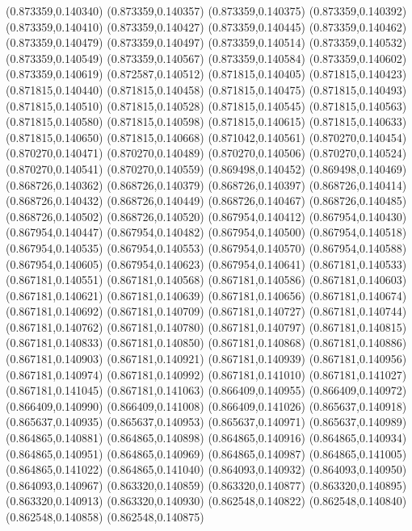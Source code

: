 (0.873359,0.140340)
(0.873359,0.140357)
(0.873359,0.140375)
(0.873359,0.140392)
(0.873359,0.140410)
(0.873359,0.140427)
(0.873359,0.140445)
(0.873359,0.140462)
(0.873359,0.140479)
(0.873359,0.140497)
(0.873359,0.140514)
(0.873359,0.140532)
(0.873359,0.140549)
(0.873359,0.140567)
(0.873359,0.140584)
(0.873359,0.140602)
(0.873359,0.140619)
(0.872587,0.140512)
(0.871815,0.140405)
(0.871815,0.140423)
(0.871815,0.140440)
(0.871815,0.140458)
(0.871815,0.140475)
(0.871815,0.140493)
(0.871815,0.140510)
(0.871815,0.140528)
(0.871815,0.140545)
(0.871815,0.140563)
(0.871815,0.140580)
(0.871815,0.140598)
(0.871815,0.140615)
(0.871815,0.140633)
(0.871815,0.140650)
(0.871815,0.140668)
(0.871042,0.140561)
(0.870270,0.140454)
(0.870270,0.140471)
(0.870270,0.140489)
(0.870270,0.140506)
(0.870270,0.140524)
(0.870270,0.140541)
(0.870270,0.140559)
(0.869498,0.140452)
(0.869498,0.140469)
(0.868726,0.140362)
(0.868726,0.140379)
(0.868726,0.140397)
(0.868726,0.140414)
(0.868726,0.140432)
(0.868726,0.140449)
(0.868726,0.140467)
(0.868726,0.140485)
(0.868726,0.140502)
(0.868726,0.140520)
(0.867954,0.140412)
(0.867954,0.140430)
(0.867954,0.140447)
(0.867954,0.140482)
(0.867954,0.140500)
(0.867954,0.140518)
(0.867954,0.140535)
(0.867954,0.140553)
(0.867954,0.140570)
(0.867954,0.140588)
(0.867954,0.140605)
(0.867954,0.140623)
(0.867954,0.140641)
(0.867181,0.140533)
(0.867181,0.140551)
(0.867181,0.140568)
(0.867181,0.140586)
(0.867181,0.140603)
(0.867181,0.140621)
(0.867181,0.140639)
(0.867181,0.140656)
(0.867181,0.140674)
(0.867181,0.140692)
(0.867181,0.140709)
(0.867181,0.140727)
(0.867181,0.140744)
(0.867181,0.140762)
(0.867181,0.140780)
(0.867181,0.140797)
(0.867181,0.140815)
(0.867181,0.140833)
(0.867181,0.140850)
(0.867181,0.140868)
(0.867181,0.140886)
(0.867181,0.140903)
(0.867181,0.140921)
(0.867181,0.140939)
(0.867181,0.140956)
(0.867181,0.140974)
(0.867181,0.140992)
(0.867181,0.141010)
(0.867181,0.141027)
(0.867181,0.141045)
(0.867181,0.141063)
(0.866409,0.140955)
(0.866409,0.140972)
(0.866409,0.140990)
(0.866409,0.141008)
(0.866409,0.141026)
(0.865637,0.140918)
(0.865637,0.140935)
(0.865637,0.140953)
(0.865637,0.140971)
(0.865637,0.140989)
(0.864865,0.140881)
(0.864865,0.140898)
(0.864865,0.140916)
(0.864865,0.140934)
(0.864865,0.140951)
(0.864865,0.140969)
(0.864865,0.140987)
(0.864865,0.141005)
(0.864865,0.141022)
(0.864865,0.141040)
(0.864093,0.140932)
(0.864093,0.140950)
(0.864093,0.140967)
(0.863320,0.140859)
(0.863320,0.140877)
(0.863320,0.140895)
(0.863320,0.140913)
(0.863320,0.140930)
(0.862548,0.140822)
(0.862548,0.140840)
(0.862548,0.140858)
(0.862548,0.140875)
